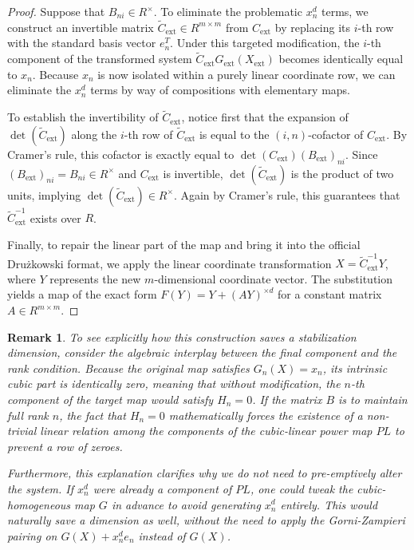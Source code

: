 \documentclass[11pt,a4paper]{article}
\newtheorem{remark}[theorem]{Remark}
\begin{document}
\begin{proof}
Suppose that $B_{ni} \in R^{\times}$. To eliminate the problematic $x_n^d$ terms, we construct an invertible matrix $\tilde{C}_{\text{ext}} \in R^{m \times m}$ from $C_{\text{ext}}$ by replacing its $i$-th row with the standard basis vector $e_n^T$. Under this targeted modification, the $i$-th component of the transformed system $\tilde{C}_{\text{ext}} G_{\text{ext}}(X_{\text{ext}})$ becomes identically equal to $x_n$. Because $x_n$ is now isolated within a purely linear coordinate row, we can eliminate the $x_n^d$ terms by way of compositions with elementary maps.

To establish the invertibility of $\tilde{C}_{\text{ext}}$, notice first that the expansion of $\det(\tilde{C}_{\text{ext}})$ along the $i$-th row of $\tilde{C}_{\text{ext}}$ is equal to the $(i,n)$-cofactor of $C_{\text{ext}}$. By Cramer's rule, this cofactor is exactly equal to $\det(C_{\text{ext}}) (B_{\text{ext}})_{ni}$. Since $(B_{\text{ext}})_{ni} = B_{ni} \in R^{\times}$ and $C_{\text{ext}}$ is invertible, $\det(\tilde{C}_{\text{ext}})$ is the product of two units, implying $\det(\tilde{C}_{\text{ext}}) \in R^{\times}$. Again by Cramer's rule, this guarantees that $\tilde{C}_{\text{ext}}^{-1}$ exists over $R$.

Finally, to repair the linear part of the map and bring it into the official Drużkowski format, we apply the linear coordinate transformation $X = \tilde{C}_{\text{ext}}^{-1} Y$, where $Y$ represents the new $m$-dimensional coordinate vector. The substitution yields a map of the exact form $F(Y) = Y + (A Y)^{\times d}$ for a constant matrix $A \in R^{m \times m}$.
\end{proof}

\begin{remark}
To see explicitly how this construction saves a stabilization dimension, consider the algebraic interplay between the final component and the rank condition. Because the original map satisfies $G_n(X) = x_n$, its intrinsic cubic part is identically zero, meaning that without modification, the $n$-th component of the target map would satisfy $H_n = 0$. If the matrix $B$ is to maintain full rank $n$, the fact that $H_n = 0$ mathematically forces the existence of a non-trivial linear relation among the components of the cubic-linear power map $\mathit{PL}$ to prevent a row of zeroes. 

Furthermore, this explanation clarifies why we do not need to pre-emptively alter the system. If $x_n^d$ were already a component of $\mathit{PL}$, one could tweak the cubic-homogeneous map $G$ in advance to avoid generating $x_n^d$ entirely. This would naturally save a dimension as well, without the need to apply the Gorni-Zampieri pairing on $G(X) + x_n^d e_n$ instead of $G(X)$.
\end{remark}
\end{document}

